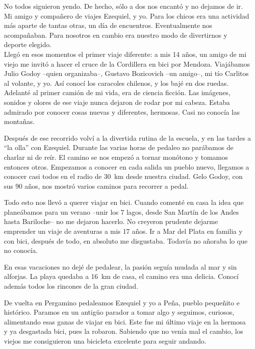 \documentclass[11pt]{book}
\begin{document}
No todos siguieron yendo. De hecho, s\'olo a dos nos encant\'o y no dejamos de
ir. Mi amigo y compa\~nero de viajes Ezequiel, y yo. Para los chicos era una
actividad m\'as aparte de tantas otras, un d\'ia de encuentros. Eventualmente
nos acompa\~naban. Para nosotros en cambio era nuestro modo de divertirnos y
deporte elegido.\\

Lleg\'o en esos momentos el primer viaje diferente: a mis 14 a\~nos, un amigo
de mi viejo me invit\'o a hacer el cruce de la Cordillera en bici por Mendoza.
Viaj\'abamos Julio Godoy --quien organizaba--, Gustavo Bozicovich --un amigo--,
mi t\'io Carlitos al volante, y yo. As\'i conoc\'i los caracoles chilenos, y
los baj\'e en dos ruedas. Adelant\'e al primer cami\'on de mi vida, era de
ciencia ficci\'on. Las im\'agenes, sonidos y olores de ese viaje nunca dejaron
de rodar por mi cabeza. Estaba admirado por conocer cosas nuevas y diferentes,
hermosas. Casi no conoc\'ia las monta\~nas.

Despu\'es de ese recorrido volv\'i a la divertida rutina de la escuela, y en
las tardes a ``la olla'' con Ezequiel. Durante las varias horas de pedaleo no
par\'abamos de charlar ni de re\'ir. El camino se nos empez\'o a tornar
mon\'otono y tomamos entonces otros. Empezamos a conocer en cada salida un
pueblo nuevo, llegamos a conocer casi todos en el radio de 30~km desde nuestra
ciudad. Gelo Godoy, con sus 90 a\~nos, nos mostr\'o varios caminos para
recorrer a pedal.

Todo esto nos llev\'o a querer viajar en bici. Cuando coment\'e en casa la idea
que plane\'abamos para un verano --unir los 7 lagos, desde San Mart\'in de los
Andes hasta Bariloche-- no me dejaron hacerlo. No creyeron prudente dejarme
emprender un viaje de aventuras a mis 17 a\~nos. Ir a Mar del Plata en familia y
con bici, despu\'es de todo, en absoluto me disgustaba. Todav\'ia no a\~noraba
lo que no conoc\'ia.

En esas vacaciones no dej\'e de pedalear, la pasi\'on segu\'ia mudada al mar y
sin alforjas. La playa quedaba a 16~km de casa, el camino era una delicia.
Conoc\'i adem\'as todos los rincones de la gran ciudad.

De vuelta en Pergamino pedaleamos Ezequiel y yo a Pe\~na, pueblo peque\~nito e
hist\'orico. Paramos en un antig\"uo parador a tomar algo y seguimos, curiosos,
alimentando esas ganas de viajar en bici. Este fue mi \'ultimo viaje en la
hermosa y ya desgastada bici, pues la robaron. Sabiendo que no ven\'ia mal el
cambio, los viejos me consiguieron una bicicleta excelente para seguir andando.
\end{document}

